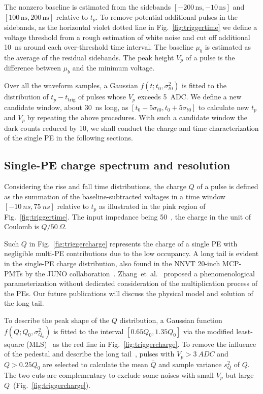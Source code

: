 The nonzero baseline is estimated from the sidebands $[-200\,\mathrm{ns},-10\,\mathrm{ns}]$ and $[100\,\mathrm{ns},200\,\mathrm{ns}]$ relative to $t_p$. %
To remove potential additional pulses in the sidebands, as the horizontal violet dotted line in Fig.~\ref{fig:triggertime} we define a voltage threshold from a rough estimation of white noise and cut off additional \SI{10}{ns} around each over-threshold time interval. The baseline $\mu_b$ is estimated as the average of the residual sidebands. The peak height $V_p$ of a pulse is the difference between $\mu_b$ and the minimum voltage.

Over all the waveform samples, a Gaussian $f(t;t_0,\sigma_{t0}^2)$ is fitted to the distribution of $t_p-t_{\mathrm{trig}}$ of pulses whose $V_p$ exceeds \SI{5}{ADC}. We define a new candidate window, about \SI{30}{ns} long, as $[t_0-5\sigma_{t0}, t_0+5\sigma_{t0}]$ to calculate new $t_p$ and $V_p$ by repeating the above procedures.  With such a candidate window the dark counts reduced by 10, we shall conduct the charge and time characterization of the single PE in the following sections.

\subsection{Single-PE charge spectrum and resolution}
\label{sec:noisepeak}

Considering the rise and fall time distributions, the charge $Q$ of a pulse is defined as %
the summation of the baseline-subtracted voltages in a time window $[\SI{-10}{ns}, \SI{75}{ns}]$ relative to $t_p$ as illustrated in the pink region of Fig.~\ref{fig:triggertime}. The input impedance being \SI{50}{\Omega}~\cite{CAENV1751}, the charge in the unit of Coulomb is $Q/\SI{50}{\Omega}$.

Such $Q$ in Fig.~\ref{fig:triggercharge} represents the charge of a single PE with negligible multi-PE contributions due to the low occupancy. A long tail is evident in the single-PE charge distribution, also found in the NNVT 20-inch MCP-PMTs by the JUNO collaboration~\cite{JUNOMassTesting}. Zhang~et~al.~\cite{JUNOLongtail} proposed a phenomenological parameterization without dedicated consideration of the multiplication process of the PEs. Our future publications will discuss the physical model and solution of the long tail.

To describe the peak shape of the $Q$ distribution, a Gaussian function $f(Q;Q_0,\sigma^2_{Q_0})$ is fitted to the interval $[0.65Q_0, 1.35Q_0]$ via the modified least-square (MLS)~\cite{Cowan1998StatisticalDA} as the red line in Fig.~\ref{fig:triggercharge}. To remove the influence of the pedestal and describe the long tail~\cite{JUNOLongtail}, pulses with $V_p>\SI{3}{ADC}$ and $Q>0.25Q_0$ are selected to calculate the mean $\overline{Q}$ and sample variance $s^2_{Q}$ of $Q$.
The two cuts are complementary to exclude some noises with small $V_p$ but large $Q$~(Fig.~\ref{fig:triggercharge}).

